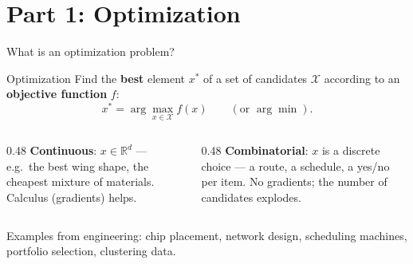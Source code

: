 \documentclass[aspectratio=169,11pt]{beamer}
\newcommand{\key}[1]{{\color{qdark}\textbf{#1}}}
\begin{document}
\section{Part 1: Optimization}
\begin{frame}{What is an optimization problem?}
  \begin{block}{Optimization}
    Find the \key{best} element $x^*$ of a set of candidates $\mathcal{X}$ according to an \key{objective function} $f$:
    \[ x^* = \arg\max_{x\in\mathcal{X}} f(x) \qquad(\text{or } \arg\min). \]
  \end{block}
  \begin{columns}[T]
    \begin{column}{0.48\textwidth}
      \key{Continuous}: $x \in \mathbb{R}^d$ --- e.g.\ the best wing shape, the cheapest mixture of materials. Calculus
      (gradients) helps.
    \end{column}
    \begin{column}{0.48\textwidth}
      \key{Combinatorial}: $x$ is a discrete choice --- a route, a schedule, a yes/no per item. No gradients; the
      number of candidates explodes.
    \end{column}
  \end{columns}
  \vspace{2mm}
  Examples from engineering: chip placement, network design, scheduling machines, portfolio selection, clustering data.
\end{frame}
\end{document}
